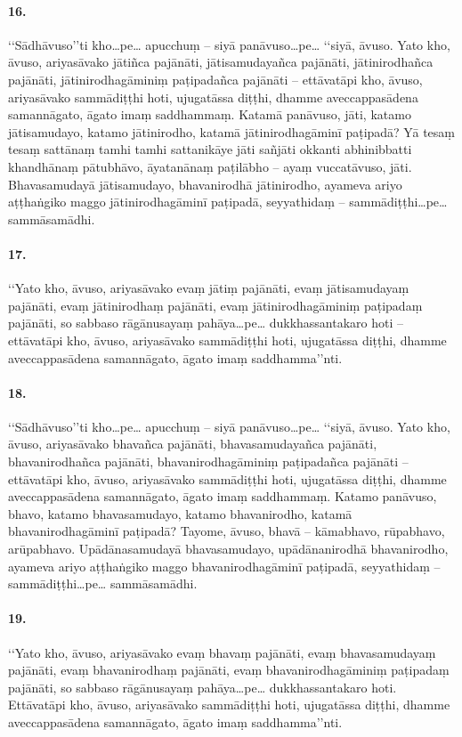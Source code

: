 \paragraph{16.} ‘‘Sādhāvuso’’ti kho…pe… apucchuṃ – siyā panāvuso…pe… ‘‘siyā, āvuso. Yato kho, āvuso, ariyasāvako jātiñca pajānāti, jātisamudayañca pajānāti, jātinirodhañca pajānāti, jātinirodhagāminiṃ paṭipadañca pajānāti – ettāvatāpi kho, āvuso, ariyasāvako sammādiṭṭhi hoti, ujugatāssa diṭṭhi, dhamme aveccappasādena samannāgato, āgato imaṃ saddhammaṃ. Katamā panāvuso, jāti, katamo jātisamudayo, katamo jātinirodho, katamā jātinirodhagāminī paṭipadā? Yā tesaṃ tesaṃ sattānaṃ tamhi tamhi sattanikāye jāti sañjāti okkanti abhinibbatti khandhānaṃ pātubhāvo, āyatanānaṃ paṭilābho – ayaṃ vuccatāvuso, jāti. Bhavasamudayā jātisamudayo, bhavanirodhā jātinirodho, ayameva ariyo aṭṭhaṅgiko maggo jātinirodhagāminī paṭipadā, seyyathidaṃ – sammādiṭṭhi…pe… sammāsamādhi.

\paragraph{17.} ‘‘Yato kho, āvuso, ariyasāvako evaṃ jātiṃ pajānāti, evaṃ jātisamudayaṃ pajānāti, evaṃ jātinirodhaṃ pajānāti, evaṃ jātinirodhagāminiṃ paṭipadaṃ pajānāti, so sabbaso rāgānusayaṃ pahāya…pe… dukkhassantakaro hoti – ettāvatāpi kho, āvuso, ariyasāvako sammādiṭṭhi hoti, ujugatāssa diṭṭhi, dhamme aveccappasādena samannāgato, āgato imaṃ saddhamma’’nti.

\paragraph{18.} ‘‘Sādhāvuso’’ti kho…pe… apucchuṃ – siyā panāvuso…pe… ‘‘siyā, āvuso. Yato kho, āvuso, ariyasāvako bhavañca pajānāti, bhavasamudayañca pajānāti, bhavanirodhañca pajānāti, bhavanirodhagāminiṃ paṭipadañca pajānāti – ettāvatāpi kho, āvuso, ariyasāvako sammādiṭṭhi hoti, ujugatāssa diṭṭhi, dhamme aveccappasādena samannāgato, āgato imaṃ saddhammaṃ. Katamo panāvuso, bhavo, katamo bhavasamudayo, katamo bhavanirodho, katamā bhavanirodhagāminī paṭipadā? Tayome, āvuso, bhavā – kāmabhavo, rūpabhavo, arūpabhavo. Upādānasamudayā bhavasamudayo, upādānanirodhā bhavanirodho, ayameva ariyo aṭṭhaṅgiko maggo bhavanirodhagāminī paṭipadā, seyyathidaṃ – sammādiṭṭhi…pe… sammāsamādhi.

\paragraph{19.} ‘‘Yato kho, āvuso, ariyasāvako evaṃ bhavaṃ pajānāti, evaṃ bhavasamudayaṃ pajānāti, evaṃ bhavanirodhaṃ pajānāti, evaṃ bhavanirodhagāminiṃ paṭipadaṃ pajānāti, so sabbaso rāgānusayaṃ pahāya…pe… dukkhassantakaro hoti. Ettāvatāpi kho, āvuso, ariyasāvako sammādiṭṭhi hoti, ujugatāssa diṭṭhi, dhamme aveccappasādena samannāgato, āgato imaṃ saddhamma’’nti.

